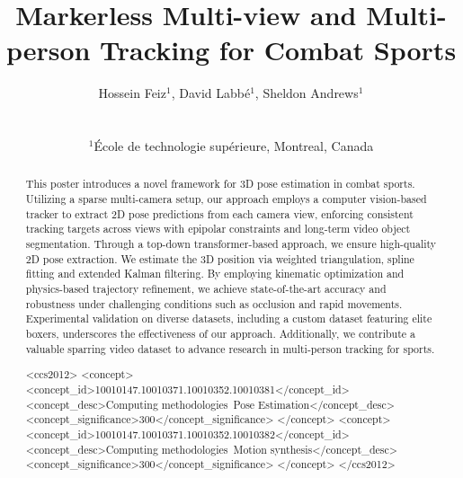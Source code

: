\documentclass{egpubl}
\title{Markerless Multi-view and Multi-person Tracking for Combat Sports}
\author[Hossein, Labbé, and Andrews]
{\parbox{\textwidth}{\centering 
        Hossein Feiz$^1$, David Labbé$^1$, Sheldon Andrews$^1$
        }
        \\
{\parbox{\textwidth}{\centering 
        $^1$École de technologie supérieure, Montreal, Canada
       }
}
}
\begin{document}

\maketitle

\begin{abstract}
   This poster introduces a novel framework for 3D pose estimation in combat sports. Utilizing a sparse multi-camera setup, our approach employs a computer vision-based tracker to extract 2D pose predictions from each camera view, enforcing consistent tracking targets across views with epipolar constraints and long-term video object segmentation. Through a top-down transformer-based approach, we ensure high-quality 2D pose extraction. We estimate the 3D position via weighted triangulation, spline fitting and extended Kalman filtering. By employing kinematic optimization and physics-based trajectory refinement, we achieve state-of-the-art accuracy and robustness under challenging conditions such as occlusion and rapid movements. Experimental validation on diverse datasets, including a custom dataset featuring elite boxers, underscores the effectiveness of our approach. Additionally, we contribute a valuable sparring video dataset to advance research in multi-person tracking for sports.


\begin{CCSXML}
<ccs2012>
<concept>
<concept_id>10010147.10010371.10010352.10010381</concept_id>
<concept_desc>Computing methodologies~Pose Estimation</concept_desc>
<concept_significance>300</concept_significance>
</concept>
<concept>
<concept_id>10010147.10010371.10010352.10010382</concept_id>
<concept_desc>Computing methodologies~Motion synthesis</concept_desc>
<concept_significance>300</concept_significance>
</concept>
</ccs2012>
\end{CCSXML}



\printccsdesc   
\end{abstract}  
\end{document}
